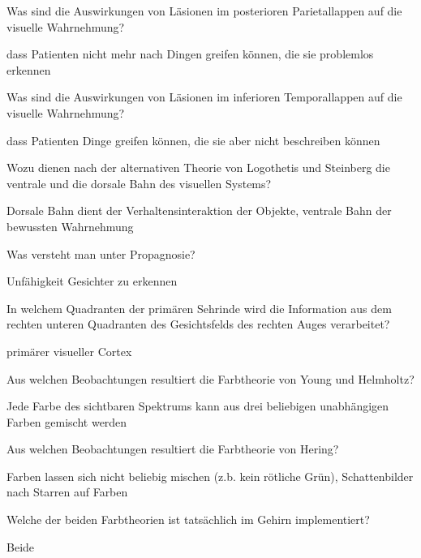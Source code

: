 \documentclass[10pt, a4paper]{exam}
\begin{document}
\begin{questions}
  \question Was sind die Auswirkungen von Läsionen im posterioren Parietallappen auf die visuelle Wahrnehmung?
  \begin{solution}
    dass Patienten nicht mehr nach Dingen greifen können, die sie problemlos erkennen
  \end{solution}

  \question Was sind die Auswirkungen von Läsionen im inferioren Temporallappen auf die visuelle Wahrnehmung?
  \begin{solution}
    dass Patienten Dinge greifen können, die sie aber nicht beschreiben können
  \end{solution}

  \question Wozu dienen nach der alternativen Theorie von Logothetis und Steinberg die ventrale und die dorsale Bahn des visuellen Systems?
  \begin{solution}
    Dorsale Bahn dient der Verhaltensinteraktion der Objekte, ventrale Bahn der bewussten Wahrnehmung
  \end{solution}

  \question Was versteht man unter Propagnosie?
  \begin{solution}
    Unfähigkeit Gesichter zu erkennen
  \end{solution}

  \question In welchem Quadranten der primären Sehrinde wird die Information aus dem rechten unteren Quadranten des Gesichtsfelds des rechten Auges verarbeitet?
  \begin{solution}
    primärer visueller Cortex
  \end{solution}

  \question Aus welchen Beobachtungen resultiert die Farbtheorie von Young und Helmholtz?
  \begin{solution}
    Jede Farbe des sichtbaren Spektrums kann aus drei beliebigen unabhängigen Farben gemischt werden
  \end{solution}

  \question Aus welchen Beobachtungen resultiert die Farbtheorie von Hering?
  \begin{solution}
    Farben lassen sich nicht beliebig mischen (z.b. kein rötliche Grün), Schattenbilder nach Starren auf Farben
  \end{solution}

  \question Welche der beiden Farbtheorien ist tatsächlich im Gehirn implementiert?
  \begin{solution}
    Beide
  \end{solution}


\end{questions}
\end{document}
